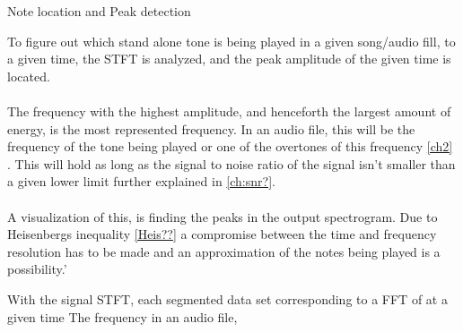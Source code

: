 Note location and Peak detection

To figure out which stand alone tone is being played in a given song/audio fill, to a given time, the STFT is analyzed, and the peak amplitude of the given time is located.\\
\\

The frequency with the highest amplitude, and henceforth the largest amount of energy, is the most represented frequency. 
In an audio file, this will be the frequency of the tone being played or one of the overtones of this frequency \ref{ch2} .
This will hold as long as the signal to noise ratio of the signal isn't smaller than a given lower limit further explained in \ref{ch:snr?}. 
\\
\\
A visualization of this, is finding the peaks in the output spectrogram.
Due to Heisenbergs inequality \ref{Heis??}  a compromise between the time and frequency resolution has to be made and an approximation of the notes being played is a possibility.'

%



With the signal STFT, each segmented data set corresponding to a FFT of at a given time 
The frequency in an audio file, 